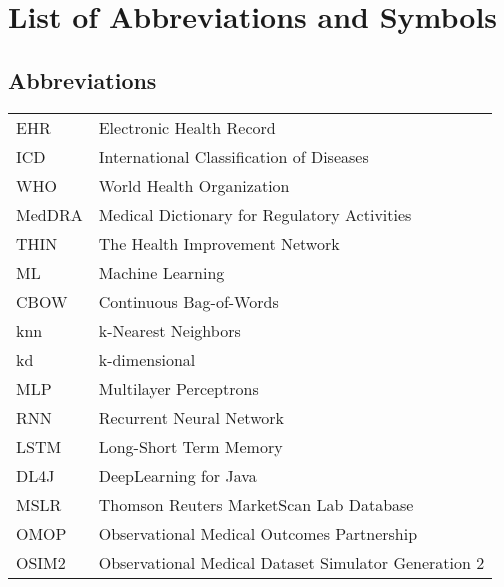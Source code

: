 \documentclass[master=ecws,masteroption=ai]{kulemt}
\begin{document}
\listoffiguresandtables
\chapter{List of Abbreviations and Symbols}
\section*{Abbreviations}
\begin{flushleft}
  \renewcommand{\arraystretch}{1.1}
  \begin{tabularx}{\textwidth}{@{}p{12mm}X@{}}
    EHR   & Electronic Health Record \\
    ICD   & International Classification of Diseases \\
    WHO  & World Health Organization \\
    MedDRA & Medical Dictionary for Regulatory Activities \\
    THIN & The Health Improvement Network \\
    ML & Machine Learning \\
    CBOW & Continuous Bag-of-Words \\
    knn & k-Nearest Neighbors \\
    kd & k-dimensional \\
    MLP & Multilayer Perceptrons \\
    RNN & Recurrent Neural Network \\
    LSTM & Long-Short Term Memory \\
    DL4J & DeepLearning for Java \\
    MSLR & Thomson Reuters MarketScan Lab Database \\
    OMOP & Observational Medical Outcomes Partnership \\
    OSIM2 & Observational Medical Dataset Simulator Generation 2 \\
  \end{tabularx}
\end{flushleft}


\mainmatter









\appendixpage*          %
\appendix






\backmatter
\nocite{*}


\end{document}
